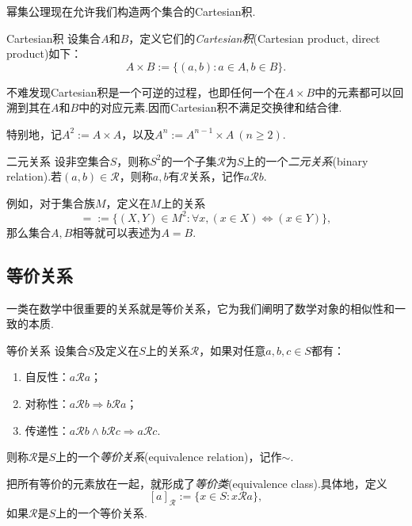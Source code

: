 幂集公理现在允许我们构造两个集合的Cartesian积.

\begin{definition}{Cartesian积}
	设集合$A$和$B$，定义它们的\textit{Cartesian积}(Cartesian product, direct product)如下：$$A \times B := \{ (a,b):a \in A,b \in B \}.$$
\end{definition}
\begin{remark}
	不难发现Cartesian积是一个可逆的过程，也即任何一个在$A \times B$中的元素都可以回溯到其在$A$和$B$中的对应元素.因而Cartesian积不满足交换律和结合律.
\end{remark}
\begin{remark}
	特别地，记$A^2:=A \times A$，以及$A^n := A^{n-1} \times A~(n \geq 2)$.
\end{remark}

\begin{definition}{二元关系}
	设非空集合$S$，则称$S^2$的一个子集$\mathcal{R}$为$S$上的一个\textit{二元关系}(binary relation).若$(a,b) \in \mathcal{R}$，则称$a,b$有$\mathcal{R}$关系，记作$a\mathcal{R}b$.
\end{definition}

例如，对于集合族$M$，定义在$M$上的关系$$\boldsymbol{=} := \{ (X,Y) \in M^2 : \forall x,(x \in X) \Leftrightarrow (x \in Y) \},$$
那么集合$A,B$相等就可以表述为$A \boldsymbol{=} B$.

\subsection{等价关系}

一类在数学中很重要的关系就是等价关系，它为我们阐明了数学对象的相似性和一致的本质.

\begin{definition}{等价关系}
	设集合$S$及定义在$S$上的关系$\mathcal{R}$，如果对任意$a,b,c \in S$都有：
	\begin{enumerate}
		\item 自反性：$a\mathcal{R} a$；
		\item 对称性：$a\mathcal{R} b \Rightarrow b\mathcal{R} a$；
		\item 传递性：$a\mathcal{R} b \wedge b\mathcal{R} c \Rightarrow a\mathcal{R} c$.
	\end{enumerate}
	则称$\mathcal{R}$是$S$上的一个\textit{等价关系}(equivalence relation)，记作$\sim$.
\end{definition}

把所有等价的元素放在一起，就形成了\textit{等价类}(equivalence class).具体地，定义$$[a]_{\mathcal{R}} := \{ x \in S:x\mathcal{R}a \},$$如果$\mathcal{R}$是$S$上的一个等价关系.

